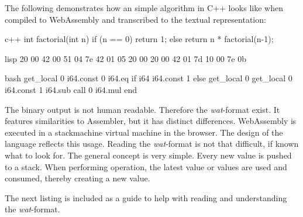 The following demonstrates how an simple algorithm in C++ looks like when compiled to WebAssembly and transcribed to the textual representation:
\begin{listing}
\noindent
\begin{minipage}[t]{0.49\textwidth}
\begin{code}[]{c++}
int factorial(int n) {
  if (n == 0)
    return 1;
  else
    return n * factorial(n-1);
}
\end{code}
\end{minipage}
\begin{minipage}[t]{0.24\textwidth}
\begin{code}[]{lisp}
20 00
42 00
51
04 7e
42 01
05
20 00
20 00
42 01
7d
10 00
7e
0b
\end{code}
\end{minipage}
\begin{minipage}[t]{0.25\textwidth}
\begin{code}[]{bash}
get_local 0
i64.const 0
i64.eq
if i64
    i64.const 1
else
    get_local 0
    get_local 0
    i64.const 1
    i64.sub
    call 0
    i64.mul
end
\end{code}
\end{minipage}
\caption{C++ source code - Wasm format - Wat format \cite{wasm:wat}}
\label{lst:wasm-code}
\end{listing}

The binary output is not human readable. Therefore the \textit{wat}-format exist. It features similarities to Assembler, but it has distinct differences. WebAssembly is executed in a \gls{stackmachine} virtual machine in the browser. The design of the language reflects this usage. Reading the \textit{wat}-format is not that difficult, if known what to look for. The general concept is very simple. Every new value is pushed to a stack. When performing operation, the latest value or values are used and consumed, thereby creating a new value. 

The next listing is included as a guide to help with reading and understanding the \textit{wat}-format.


